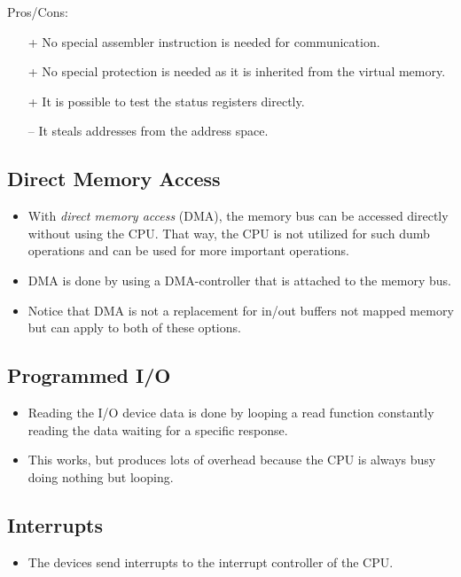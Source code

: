 				Pros/Cons:
				\begin{itemize}
					\item[+] No special assembler instruction is needed for communication.
					\item[+] No special protection is needed as it is inherited from the virtual memory.
					\item[+] It is possible to test the status registers directly.
					\item[--] It steals addresses from the address space.
				\end{itemize}

		\subsection{Direct Memory Access}
			\begin{itemize}
				\item With \textit{direct memory access} (DMA), the memory bus can be accessed directly without using the CPU. That way, the CPU is not utilized for such dumb operations and can be used for more important operations.
				\item DMA is done by using a DMA-controller that is attached to the memory bus.
				\item Notice that DMA is not a replacement for in/out buffers not mapped memory but can apply to both of these options.
			\end{itemize}

		\subsection{Programmed I/O}
			\begin{itemize}
				\item Reading the I/O device data is done by looping a read function constantly reading the data waiting for a specific response.
				\item This works, but produces lots of overhead because the CPU is always busy doing nothing but looping.
			\end{itemize}

		\subsection{Interrupts}
			\begin{itemize}
				\item The devices send interrupts to the interrupt controller of the CPU.
			\end{itemize}

